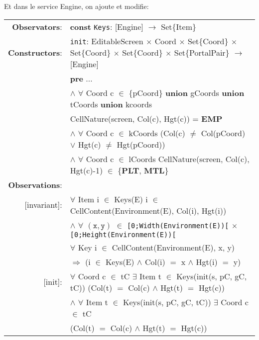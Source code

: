 \documentclass[8pt]{article}
\begin{document}
Et dans le service \textrm{Engine}, on ajoute et modifie:
{\small
  \begin{longtable}{rl}
    \textbf{Observators}: & \textbf{const} \texttt{Keys}: \textrm{[Engine]} $\rightarrow$ \textrm{Set\{Item\}} \\
    \textbf{Constructors}: &\texttt{init}: \textrm{EditableScreen} $\times$ \textrm{Coord} $\times$ \textrm{Set\{Coord\}} $\times$ \textrm{Set\{Coord\}} $\times$ \textrm{Set\{Coord\}} $\times$ \textrm{Set\{PortalPair\}} $\rightarrow$ \textrm{[Engine]} \\
    & \quad \textbf{pre} $\ldots$\\
    & \quad\quad\quad $\land$ $\forall$ \textrm{Coord} c $\in$ \{pCoord\} \textbf{union} gCoords \textbf{union} tCoords \textbf{union} kcoords\\
    & \quad\quad\quad\quad\quad \textrm{CellNature(screen, Col(c), Hgt(c))} = \textbf{EMP} \\
    & \quad\quad\quad $\land$ $\forall$ \textrm{Coord} c $\in$ kCoords (\textrm{Col(c)} $\neq$ \textrm{Col(pCoord)} $\lor$ \textrm{Hgt(c)} $\neq$ \textrm{Hgt(pCoord)})\\
    & \quad\quad\quad $\land$ $\forall$ \textrm{Coord} c $\in$ lCoords \textrm{CellNature(screen, Col(c), Hgt(c)-1)} $\in$ \{\textbf{PLT}, \textbf{MTL}\} \\
    \textbf{Observations}: &\\
    \textrm{[invariant]}: & $\forall$ \textrm{Item} i $\in$ \textrm{Keys(E)} i $\in$ \textrm{CellContent(Environment(E), Col(i), Hgt(i))}\\
    & \quad\quad $\land$ $\forall$ $(\mathtt{x},\mathtt{y})$ $\in$ \texttt{[0;Width(Environment(E))[} $\times$ \texttt{[0;Height(Environment(E))[}\\
    & \quad\quad\quad\quad $\forall$ \textrm{Key} i $\in$ \textrm{CellContent(Environment(E), x, y)} \\
    & \quad\quad\quad\quad\quad\quad $\Rightarrow$ (i $\in$ \textrm{Keys(E)} $\land$ \textrm{Col(i)} $=$ x $\land$ \textrm{Hgt(i)} $=$ y)\\
    \textrm{[init]}: & $\forall$ \textrm{Coord} c $\in$ tC $\exists$ \textrm{Item} t $\in$ \textrm{Keys(init(s, pC, gC, tC))} (\textrm{Col(t)} $=$ \textrm{Col(c)} $\land$ \textrm{Hgt(t)} $=$ \textrm{Hgt(c)})\\
  & \quad\quad $\land$ $\forall$ \textrm{Item} t $\in$ \textrm{Keys(init(s, pC, gC, tC))} $\exists$ \textrm{Coord} c $\in$ tC\\
  & \quad\quad\quad\quad (\textrm{Col(t)} $=$ \textrm{Col(c)} $\land$ \textrm{Hgt(t)} $=$ \textrm{Hgt(c)})\\

\end{longtable}}
\end{document}
